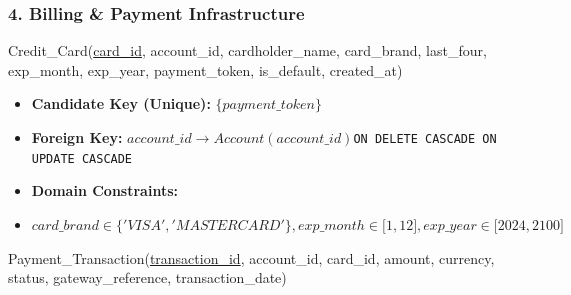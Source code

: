 \subsubsection*{4. Billing \& Payment Infrastructure}

\par\noindent\begin{minipage}{\linewidth}\raggedright\small Credit\_\allowbreak{}Card(\underline{card\_\allowbreak{}id},\allowbreak{} account\_\allowbreak{}id,\allowbreak{} cardholder\_\allowbreak{}name,\allowbreak{} card\_\allowbreak{}brand,\allowbreak{} last\_\allowbreak{}four,\allowbreak{} exp\_\allowbreak{}month,\allowbreak{} exp\_\allowbreak{}year,\allowbreak{} payment\_\allowbreak{}token,\allowbreak{} is\_\allowbreak{}default,\allowbreak{} created\_\allowbreak{}at)\end{minipage}\par

\begin{itemize}
\item
  \textbf{Candidate Key (Unique):} \(\{ payment\_\allowbreak{} token\}\)
\item
  \textbf{Foreign Key:} \(account\_\allowbreak{} id \rightarrow Account(account\_\allowbreak{} id)\)\linebreak \texttt{ON DELETE CASCADE ON UPDATE CASCADE}
\item
  \textbf{Domain Constraints:\\
  }
\item
  \(card\_\allowbreak{} brand \in \{'VISA','MASTERCARD'\},exp\_\allowbreak{} month \in \lbrack 1,12\rbrack,exp\_\allowbreak{} year \in \lbrack 2024,2100\rbrack\)
\end{itemize}

\par\noindent\begin{minipage}{\linewidth}\raggedright\small Payment\_\allowbreak{}Transaction(\underline{transaction\_\allowbreak{}id},\allowbreak{} account\_\allowbreak{}id,\allowbreak{} card\_\allowbreak{}id,\allowbreak{} amount,\allowbreak{} currency,\allowbreak{} status,\allowbreak{} gateway\_\allowbreak{}reference,\allowbreak{} transaction\_\allowbreak{}date)\end{minipage}\par

